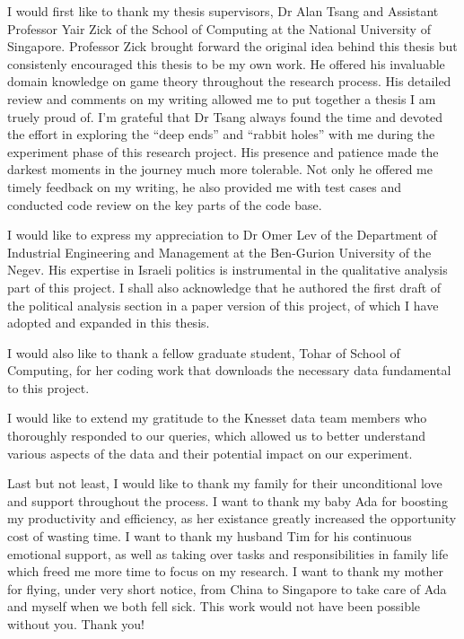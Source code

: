 \begin{acknowledgments}
  I would first like to thank my thesis supervisors, Dr Alan Tsang and
  Assistant Professor Yair Zick of the School of Computing at the National
  University of Singapore.
  Professor Zick brought forward the original idea behind this thesis but
  consistenly encouraged this thesis to be my own work.
  He offered his invaluable domain knowledge on game theory throughout the
  research process.
  His detailed review and comments on my writing allowed me to put together
  a thesis I am truely proud of.
  I'm grateful that Dr Tsang always found the time and devoted the effort in
  exploring the ``deep ends'' and ``rabbit holes'' with me during the
  experiment phase of this research project.
  His presence and patience made the darkest moments in the journey much more
  tolerable.
  Not only he offered me timely feedback on my writing, he also provided me
  with test cases and conducted code review on the key parts of the code base.

  I would like to express my appreciation to Dr Omer Lev of the Department of
  Industrial Engineering and Management at the Ben-Gurion University of the
  Negev.
  His expertise in Israeli politics is instrumental in the qualitative analysis
  part of this project.
  I shall also acknowledge that he authored the first draft of the political
  analysis section in a paper version of this project, of which I have adopted
  and expanded in this thesis.

  I would also like to thank a fellow graduate student, Tohar of School of
  Computing, for her coding work that downloads the necessary data fundamental
  to this project.

  I would like to extend my gratitude to the Knesset data team members who
  thoroughly responded to our queries, which allowed us to better understand
  various aspects of the data and their potential impact on our experiment.

  Last but not least, I would like to thank my family for their unconditional
  love and support throughout the process.
  I want to thank my baby Ada for boosting my productivity and efficiency, as
  her existance greatly increased the opportunity cost of wasting time.
  I want to thank my husband Tim for his continuous emotional support, as well
  as taking over tasks and responsibilities in family life which freed me more
  time to focus on my research.
  I want to thank my mother for flying, under very short notice, from China to
  Singapore to take care of Ada and myself when we both fell sick.
  This work would not have been possible without you. Thank you!

\end{acknowledgments}
